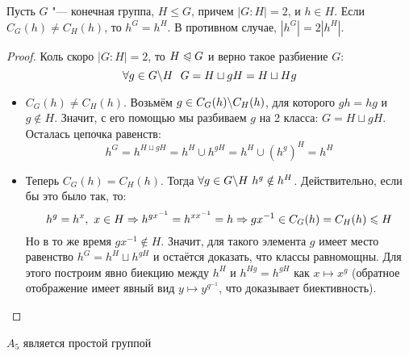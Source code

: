 \begin{proposition}
	Пусть $G$ "--- конечная группа, $H \le G$, причем $|G : H| = 2$, и $h \in H$. Если $C_G(h) \ne C_H(h)$, то $h^G = h^H$. В противном случае, $|h^G| = 2|h^H|$.
\end{proposition}

\begin{proof}
	Коль скоро $|G \colon H| = 2$, то $H \trianglelefteqslant G$ и верно такое разбиение $G$:
	\[
		\forall g \in G \backslash H\ \ G = H \sqcup gH = H \sqcup Hg
	\]
	\begin{itemize}
		\item $C_G(h) \neq C_H(h)$. Возьмём $g \in C_G(h) \backslash C_H(h)$, для которого $gh = hg$ и $g \notin H$. Значит, с его помощью мы разбиваем $g$ на 2 класса: $G = H \sqcup gH$. Осталась цепочка равенств:
		\[
			h^G = h^{H \sqcup gH} = h^H \cup h^{gH} = h^H \cup (h^g)^H = h^H
		\]
		
		\item Теперь $C_G(h) = C_H(h)$. Тогда $\forall g \in G \backslash H\ h^g \notin h^H$. Действительно, если бы это было так, то:
		\[
			h^g = h^x,\ x \in H \Rightarrow h^{gx^{-1}} = h^{xx^{-1}} = h \Rightarrow gx^{-1} \in C_G(h) = C_H(h) \leqslant H
		\]
		Но в то же время $gx^{-1} \notin H$. Значит, для такого элемента $g$ имеет место равенство $h^G = h^H \sqcup h^{gH}$ и остаётся доказать, что классы равномощны. Для этого построим явно биекцию между $h^H$ и $h^{Hg} = h^{gH}$ как $x \mapsto x^g$ (обратное отображение имеет явный вид $y \mapsto y^{g^{-1}}$, что доказывает биективность).
	\end{itemize}
\end{proof}

\begin{theorem}
	$A_5$ является простой группой
\end{theorem}

